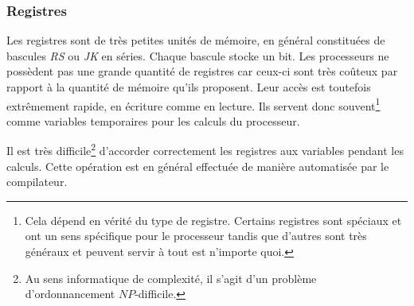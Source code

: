 \documentclass[../../../main.tex]{subfiles}
\begin{document}
\subsubsection{Registres}
Les registres sont de très petites unités de mémoire, en général constituées de bascules \textit{RS} ou \textit{JK} en séries. Chaque bascule stocke un bit. Les processeurs ne possèdent pas une grande quantité de registres car ceux-ci sont très coûteux par rapport à la quantité de mémoire qu'ils proposent. Leur accès est toutefois extrêmement rapide, en écriture comme en lecture. Ils servent donc souvent\footnote{Cela dépend en vérité du type de registre. Certains registres sont spéciaux et ont un sens spécifique pour le processeur tandis que d'autres sont très généraux et peuvent servir à tout est n'importe quoi.} comme variables temporaires pour les calculs du processeur.

Il est très difficile\footnote{Au sens informatique de complexité, il s'agit d'un problème d'ordonnancement $NP$-difficile.} d'accorder correctement les registres aux variables pendant les calculs. Cette opération est en général effectuée de manière automatisée par le compilateur.	
\end{document}
